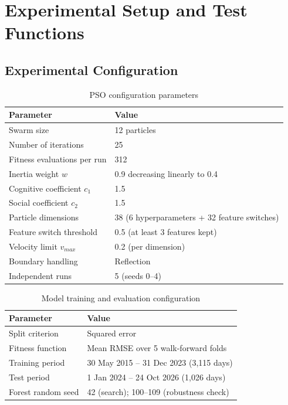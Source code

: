 \section{Experimental Setup and Test Functions}

\subsection{Experimental Configuration}

\begin{table}[H]
\centering
\caption{PSO configuration parameters}
\begin{tabular}{|l|l|}
\hline
\textbf{Parameter} & \textbf{Value} \\ \hline
Swarm size & 12 particles \\
Number of iterations & 25 \\
Fitness evaluations per run & 312 \\
Inertia weight $w$ & 0.9 decreasing linearly to 0.4 \\
Cognitive coefficient $c_1$ & 1.5 \\
Social coefficient $c_2$ & 1.5 \\
Particle dimensions & 38 (6 hyperparameters + 32 feature switches) \\
Feature switch threshold & 0.5 (at least 3 features kept) \\
Velocity limit $v_{max}$ & 0.2 (per dimension) \\
Boundary handling & Reflection \\
Independent runs & 5 (seeds 0--4) \\ \hline
\end{tabular}
\end{table}

\begin{table}[H]
\centering
\caption{Model training and evaluation configuration}
\begin{tabular}{|l|l|}
\hline
\textbf{Parameter} & \textbf{Value} \\ \hline
Split criterion & Squared error \\
Fitness function & Mean RMSE over 5 walk-forward folds \\
Training period & 30 May 2015 -- 31 Dec 2023 (3,115 days) \\
Test period & 1 Jan 2024 -- 24 Oct 2026 (1,026 days) \\
Forest random seed & 42 (search); 100--109 (robustness check) \\ \hline
\end{tabular}
\end{table}

